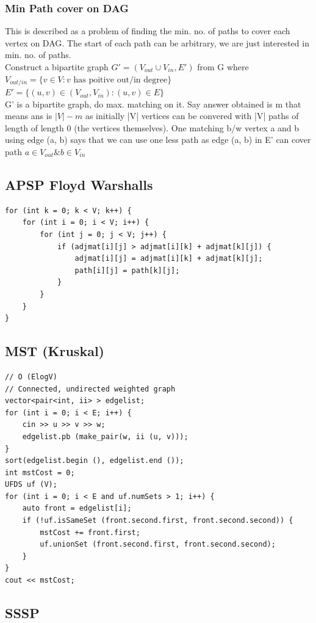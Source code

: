 \documentclass[8pt, a4paper, oneside, twocolumn]{extarticle}
\begin{document}
\subsubsection{Min Path cover on DAG}
This is described as a problem of finding the min. no. of paths to cover each vertex on DAG. The start of each path can be arbitrary, we are just interested in min. no. of paths.
\\Construct a bipartite graph $G' = (V_{out} \cup V_{in}, E')$ from G where $V_{out/in} = \{v \in V: v \text{ has poitive out/in degree}\}$
\\$E' = \{(u, v) \in (V_{out}, V_{in}) : (u, v) \in E\}$
\\G' is a bipartite graph, do max. matching on it. Say answer obtained is m that means ans is $|V| - m$ as initially |V| vertices can be convered with |V| paths of length of length 0 (the vertices themselves). One matching b/w vertex a and b using edge (a, b) says that we can use one less path as edge (a, b) in E' can cover path $a \in V_{out} \& b\in V_{in}$
\subsection{APSP Floyd Warshalls}
\begin{verbatim}
for (int k = 0; k < V; k++) {
    for (int i = 0; i < V; i++) {
        for (int j = 0; j < V; j++) {
            if (adjmat[i][j] > adjmat[i][k] + adjmat[k][j]) {
                adjmat[i][j] = adjmat[i][k] + adjmat[k][j];
                path[i][j] = path[k][j];
            }
        }
    }
}
\end{verbatim}
\subsection{MST (Kruskal)}
\begin{verbatim}
// O (ElogV)
// Connected, undirected weighted graph
vector<pair<int, ii> > edgelist;
for (int i = 0; i < E; i++) {
    cin >> u >> v >> w;
    edgelist.pb (make_pair(w, ii (u, v)));
}
sort(edgelist.begin (), edgelist.end ());
int mstCost = 0;
UFDS uf (V);
for (int i = 0; i < E and uf.numSets > 1; i++) {
    auto front = edgelist[i];
    if (!uf.isSameSet (front.second.first, front.second.second)) {
        mstCost += front.first;
        uf.unionSet (front.second.first, front.second.second);
    }
}
cout << mstCost;
\end{verbatim}
\subsection{SSSP}
\end{document}
